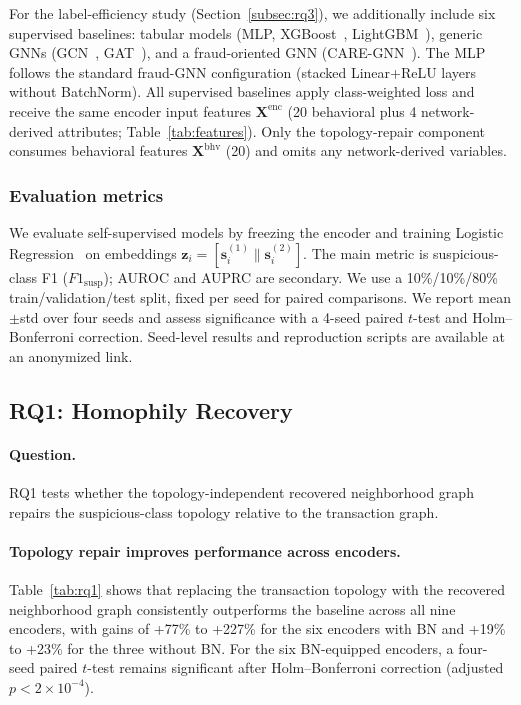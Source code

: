 \documentclass[sigconf,natbib=true,anonymous=true]{acmart}
\theoremstyle{definition}
\begin{document}
For the label-efficiency study (Section~\ref{subsec:rq3}), we additionally include six supervised baselines: tabular models (MLP, XGBoost~\cite{xgboost2016}, LightGBM~\cite{lightgbm2017}), generic GNNs (GCN~\cite{kipf2016semi}, GAT~\cite{velivckovic2017graph}), and a fraud-oriented GNN (CARE-GNN~\cite{dou2020enhancing}). The MLP follows the standard fraud-GNN configuration (stacked Linear+ReLU layers without BatchNorm). All supervised baselines apply class-weighted loss and receive the same encoder input features $\mathbf{X}^{\text{enc}}$ (20 behavioral plus 4 network-derived attributes; Table~\ref{tab:features}). Only the topology-repair component consumes behavioral features $\mathbf{X}^{\text{bhv}}$ (20) and omits any network-derived variables.

\subsubsection{Evaluation metrics} We evaluate self-supervised models by freezing the encoder and training Logistic Regression~\cite{pedregosa2011scikit} on embeddings $\mathbf{z}_i = [\mathbf{s}_i^{(1)} \| \mathbf{s}_i^{(2)}]$. The main metric is suspicious-class F1 ($F1_{\text{susp}}$); AUROC and AUPRC are secondary. We use a 10\%/10\%/80\% train/validation/test split, fixed per seed for paired comparisons. We report mean$\pm$std over four seeds and assess significance with a 4-seed paired $t$-test and Holm--Bonferroni correction. Seed-level results and reproduction scripts are available at an anonymized link.

\subsection{RQ1: Homophily Recovery}\label{subsec:rq1}
\paragraph{\textbf{Question.}} RQ1 tests whether the topology-independent recovered neighborhood graph repairs the suspicious-class topology relative to the transaction graph.

\paragraph{\textbf{Topology repair improves performance across encoders.}} Table~\ref{tab:rq1} shows that replacing the transaction topology with the recovered neighborhood graph consistently outperforms the baseline across all nine encoders, with gains of +77\% to +227\% for the six encoders with BN and +19\% to +23\% for the three without BN. For the six BN-equipped encoders, a four-seed paired $t$-test remains significant after Holm--Bonferroni correction (adjusted $p < 2 \times 10^{-4}$).
\end{document}
